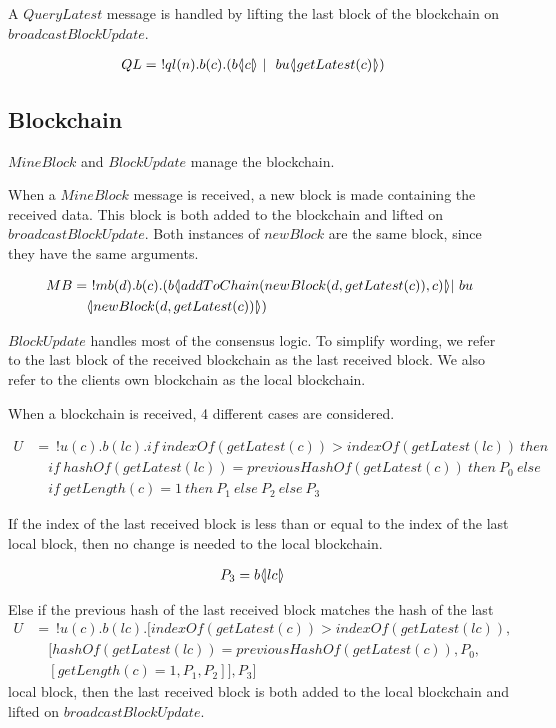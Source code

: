 A $QueryLatest$ message is handled by lifting the last block of the blockchain on $broadcastBlockUpdate$.

\begin{align*}
	QL &=\ !ql(n).b(c).(b  \langle \! | c | \! \rangle\ |\ \ bu \langle \! | getLatest(c) | \! \rangle)
\end{align*}

\subsection{Blockchain}

$MineBlock$ and $BlockUpdate$ manage the blockchain.

When a $MineBlock$ message is received, a new block is made containing the received data.
This block is both added to the blockchain and lifted on $broadcastBlockUpdate$.
Both instances of $newBlock$ are the same block, since they have the same arguments.

\begin{align*}
    MB &=\ !mb(d).b(c).(b  \langle \! | addToChain(newBlock(d,getLatest(c)),c) | \! \rangle| \ bu\\
    &\quad  \langle \! | newBlock(d, getLatest(c)) | \! \rangle)
\end{align*}

$BlockUpdate$ handles most of the consensus logic.
To simplify wording, we refer to the last block of the received blockchain as the last received block.
We also refer to the clients own blockchain as the local blockchain.

When a blockchain is received, 4 different cases are considered.

\begin{align*}
	U &=\ !u(c).b(lc).if\ indexOf( getLatest(c))>indexOf(getLatest(lc))\ then\\
	&\quad if\ hashOf(getLatest(lc))=previousHashOf(getLatest(c))\ then\ P_0\ else\\ &\quad if\ getLength(c)=1\ then\ P_1\ else\ P_2\ else\ P_3
\end{align*}

If the index of the last received block is less than or equal to the index of the last local block, then no change is needed to the local blockchain.

\begin{align*}
	P_3 &= b \langle \! | lc | \! \rangle
\end{align*}

Else if the previous hash of the last received block matches the hash of the last
\begin{align*}
	U &=\ !u(c).b(lc).[indexOf( getLatest(c))>indexOf(getLatest(lc)),\\
	&\quad[hashOf(getLatest(lc))=previousHashOf(getLatest(c)),P_0,\\ &\quad[getLength(c)=1,P_1,P_2]],P_3]
\end{align*} local block, then the last received block is both added to the local blockchain and lifted on $broadcastBlockUpdate$.

